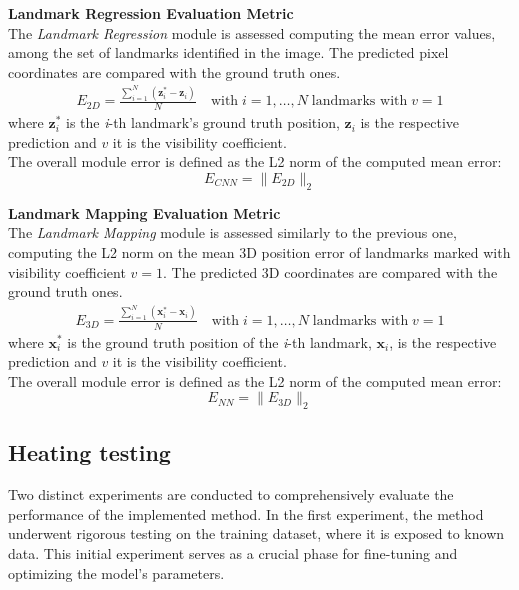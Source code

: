 \textbf{Landmark Regression Evaluation Metric}\\
The \textit{Landmark Regression} module is assessed computing the mean error values, among the set of landmarks identified in the image. The predicted pixel coordinates are compared with the ground truth ones.\\
\begin{equation}
\begin{aligned}
    E_{2D} = \frac{\sum_{i=1}^{N} (\textbf{z}^{*}_{i}-\textbf{z}_i)}{N} \quad \text{with} \; i=1,\dots,N \; \text{landmarks with} \; v=1
\end{aligned}
\end{equation}
where $\textbf{z}_{i}^{*}$ is the \textit{i}-th landmark's ground truth position, $\textbf{z}_{i}$ is the respective prediction and $v$ it is the visibility coefficient.\\
The overall module error is defined as the L2 norm of the computed mean error:
\begin{equation}
    E_{CNN} = \|E_{2D}\|_2
\end{equation}

\textbf{Landmark Mapping Evaluation Metric}\\
The \textit{Landmark Mapping} module is assessed similarly to the previous one, computing the L2 norm on the mean 3D position error of landmarks marked with visibility coefficient $v = 1$. The predicted 3D coordinates are compared with the ground truth ones.\\
\begin{equation}
\begin{aligned}
    E_{3D} = \frac{\sum_{i=1}^{N} (\textbf{x}^{*}_{i}-\textbf{x}_i)}{N} \quad \text{with} \; i=1,\dots,N \; \text{landmarks with} \; v=1
\end{aligned}
\end{equation}
where $\textbf{x}^{*}_{i}$ is the ground truth position of the \textit{i}-th landmark, $\textbf{x}_i$, is the respective prediction and $v$ it is the visibility coefficient.\\
The overall module error is defined as the L2 norm of the computed mean error:
\begin{equation}
    E_{NN} = \|E_{3D}\|_2
\end{equation}

\subsection{Heating testing}
\label{Chapter5/EvalTraining}
Two distinct experiments are conducted to comprehensively evaluate the performance of the implemented method. In the first experiment, the method underwent rigorous testing on the training dataset, where it is exposed to known data. This initial experiment serves as a crucial phase for fine-tuning and optimizing the model's parameters.

